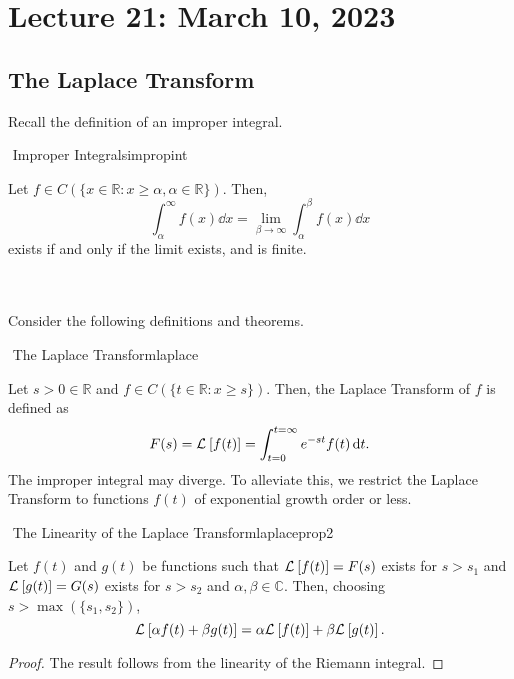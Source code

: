 \pagebreak

\section{Lecture 21: March 10, 2023}

    \subsection{The Laplace Transform}

        Recall the definition of an improper integral.
        \begin{definition}{\Stop\,\,Improper Integrals}{impropint}

            Let \(f\in C(\{x\in\mathbb{R}:x\geq \alpha, \alpha\in\mathbb{R}\})\). Then,
            \begin{equation*}
                \int_\alpha^\infty f(x)\dd x=\lim_{\beta\to \infty}\int_\alpha^\beta f(x)\dd x
            \end{equation*}
            exists if and only if the limit exists, and is finite.
            
        \end{definition}
        \vphantom
        \\
        \\
        Consider the following definitions and theorems.
        \begin{definition}{\Stop\,\,The Laplace Transform}{laplace}
        
            Let \(s>0\in\mathbb{R}\) and \(f\in C(\{t\in\mathbb{R}:x\geq s\})\). Then, the Laplace Transform of \(f\) is defined as
            \begin{equation*}
                F(s)=\mathcal{L}^{}\left[f(t)\right]=\int_{t=0}^{t=\infty} e^{-st}f(t)\,\text{d} t.
            \end{equation*}
            The improper integral may diverge. To alleviate this, we restrict the Laplace Transform to functions \(f(t)\) of exponential growth order or less.
        
        \end{definition}
        \begin{theorem}{\Stop\,\,The Linearity of the Laplace Transform}{laplaceprop2}
    
            Let \(f(t)\) and \(g(t)\) be functions such that \(\mathcal{L}^{}\left[f(t)\right]=F(s)\) exists for \(s>s_1\) and \(\mathcal{L}^{}\left[g(t)\right]=G(s)\) exists for \(s>s_2\) and \(\alpha,\beta\in\mathbb{C}\). Then, choosing \(s>\max(\{s_1,s_2\})\),
            \begin{equation*}
                \mathcal{L}^{}\left[\alpha f(t)+\beta g(t)\right]=\alpha\mathcal{L}^{}\left[f(t)\right]+\beta\mathcal{L}^{}\left[g(t)\right].
            \end{equation*}
            \begin{proof}
                The result follows from the linearity of the Riemann integral.
            \end{proof}
        
        \end{theorem}
